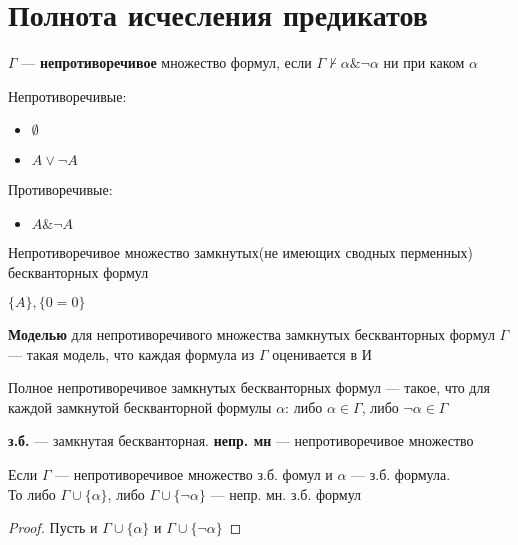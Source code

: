 \documentclass[oneside]{book}
\begin{document}
\section{Полнота исчесления предикатов}
\label{sec:org3a9266c}
\begin{definition}
	\(\Gamma\) --- \textbf{непротиворечивое} множество формул, если \(\Gamma \not\vdash \alpha \& \neg \alpha\) ни при каком \(\alpha\)
	\label{org51f1885}
\end{definition}
\begin{examp}
	Непротиворечивые:
	\begin{itemize}
		\item \(\emptyset\)
		\item \(A \vee \neg A\)
	\end{itemize}
	Противоречивые:
	\begin{itemize}
		\item \(A \& \neg A\)
	\end{itemize}
\end{examp}
\begin{remark}
	Непротиворечивое множество замкнутых(не имеющих сводных перменных) бескванторных формул
	\label{orge7c2fcb}
\end{remark}
\begin{examp}
	\(\{A\}, \{0 = 0\}\)
\end{examp}
\begin{definition}
	\textbf{Моделью} для непротиворечивого множества замкнутых бескванторных формул \(\Gamma\) --- такая модель, что каждая формула из \(\Gamma\) оценивается в И
	\label{org410f03c}
\end{definition}
\begin{definition}
	Полное непротиворечивое замкнутых бескванторных формул --- такое, что для каждой замкнутой бескванторной формулы \(\alpha\): либо \(\alpha \in \Gamma\), либо \(\neg \alpha \in \Gamma\)
	\label{org19bf6f0}
\end{definition}
\begin{symb}
	\textbf{з.б.} --- замкнутая бескванторная. \textbf{непр. мн} --- непротиворечивое множество
\end{symb}
\begin{theorem}
	Если \(\Gamma\) --- непротиворечивое множество з.б. фомул и \(\alpha\) --- з.б.  формула. \\
	То либо \(\Gamma \cup \{\alpha\}\), либо \(\Gamma \cup \{\neg \alpha\}\) --- непр. мн. з.б. формул
	\label{org0071289}
\end{theorem}
\begin{proof}
	Пусть и \(\Gamma \cup \{\alpha\}\) и \(\Gamma \cup \{\neg \alpha\}\)\todo
\end{proof}
\end{document}
